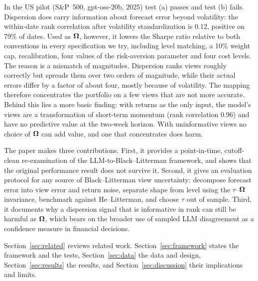 In the US pilot (S\&P~500, gpt-oss-20b, 2025) test (a) passes and test (b) fails. Dispersion does carry information about forecast error beyond volatility: the within-date rank correlation after volatility standardization is 0.12, positive on 79\% of dates. Used as $\bm{\Omega}$, however, it lowers the Sharpe ratio relative to both conventions in every specification we try, including level matching, a 10\% weight cap, recalibration, four values of the risk-aversion parameter and four cost levels. The reason is a mismatch of magnitudes. Dispersion ranks views roughly correctly but spreads them over two orders of magnitude, while their actual errors differ by a factor of about four, mostly because of volatility. The mapping therefore concentrates the portfolio on a few views that are not more accurate. Behind this lies a more basic finding: with returns as the only input, the model's views are a transformation of short-term momentum (rank correlation 0.96) and have no predictive value at the two-week horizon. With uninformative views no choice of $\bm{\Omega}$ can add value, and one that concentrates does harm.

The paper makes three contributions. First, it provides a point-in-time, cutoff-clean re-examination of the LLM-to-Black--Litterman framework, and shows that the original performance result does not survive it. Second, it gives an evaluation protocol for any source of Black--Litterman view uncertainty: decompose forecast error into view error and return noise, separate shape from level using the $\tau$--$\bm{\Omega}$ invariance, benchmark against He--Litterman, and choose $\tau$ out of sample. Third, it documents why a dispersion signal that is informative in rank can still be harmful as $\bm{\Omega}$, which bears on the broader use of sampled LLM disagreement as a confidence measure in financial decisions.

Section~\ref{sec:related} reviews related work. Section~\ref{sec:framework} states the framework and the tests, Section~\ref{sec:data} the data and design, Section~\ref{sec:results} the results, and Section~\ref{sec:discussion} their implications and limits.
